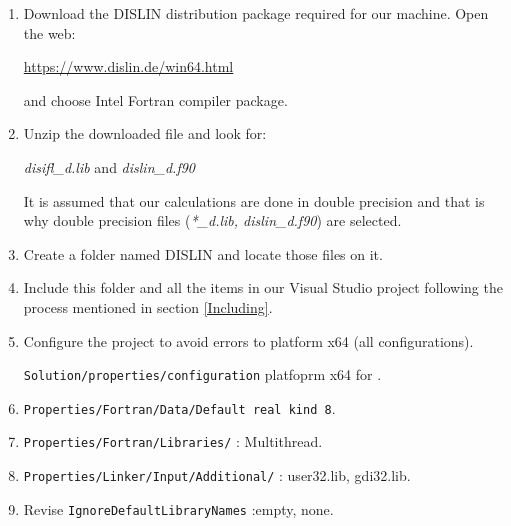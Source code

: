 \begin{enumerate}
     \setlength\itemsep{0.0cm}
    \item Download the DISLIN distribution package required for our machine. Open the web:
    
    \url{https://www.dislin.de/win64.html} 
    
    and choose Intel Fortran compiler package. 
    
    \item  Unzip the downloaded file and look for: 
    
    \textit{disifl\_d.lib} and \textit{dislin\_d.f90}
     
    It is assumed that our calculations are done in double precision and that is why double precision files (\textit{*\_d.lib, dislin\_d.f90}) are selected. 
     
    \item Create a folder named DISLIN and locate those files on it. 
    
    \item Include this folder and all the items in our Visual Studio project following the process mentioned in section \ref{Including}.
    \item Configure the project to avoid errors to platform x64 (all configurations).
    
        \texttt{Solution/properties/configuration} platfoprm x64 for . 
    \item \texttt{Properties/Fortran/Data/Default real kind 8}. 
    
    \item \texttt{Properties/Fortran/Libraries/} : Multithread.
     
    \item \texttt{Properties/Linker/Input/Additional/} : user32.lib, gdi32.lib. 
        
    \item Revise \texttt{IgnoreDefaultLibraryNames} :empty, none.  
    
\end{enumerate}     
    
%    
%    
%    
 



